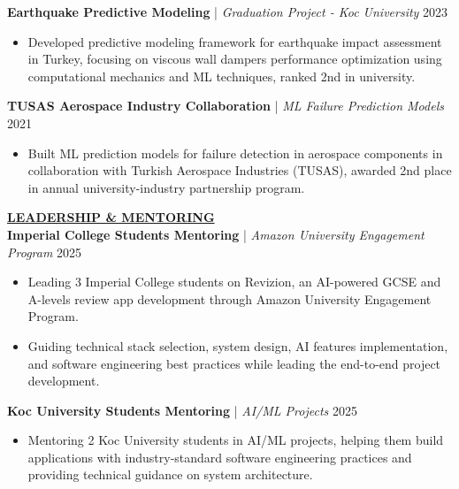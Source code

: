 \documentclass{article}
\newlength{\remaining}
\renewcommand{\section}[1]{
  \vspace{1.0em}\setlength{\remaining}{\textwidth-\widthof{\uppercase{#1}}}
    \noindent\underline{\fontsize{10}{15}\bfseries\uppercase{#1}\hspace*{\remaining}} \\
}
\renewcommand{\subsection}[3]{
    \noindent\textbf{#1} | \emph{#2} \hfill #3  
}
\begin{document}
    \subsection{Earthquake Predictive Modeling}{Graduation Project - Koc University}{2023}
    \begin{itemize}
        \item Developed predictive modeling framework for earthquake impact assessment in Turkey, focusing on viscous wall dampers performance optimization using computational mechanics and ML techniques, ranked 2nd in university.
    \end{itemize}

    \subsection{TUSAS Aerospace Industry Collaboration}{ML Failure Prediction Models}{2021}
    \begin{itemize}
        \item Built ML prediction models for failure detection in aerospace components in collaboration with Turkish Aerospace Industries (TUSAS), awarded 2nd place in annual university-industry partnership program.
    \end{itemize}


\section{Leadership \& Mentoring}
\subsection{Imperial College Students Mentoring}{Amazon University Engagement Program}{2025}
\begin{itemize}
    \item Leading 3 Imperial College students on Revizion, an AI-powered GCSE and A-levels review app development through Amazon University Engagement Program.
    \item Guiding technical stack selection, system design, AI features implementation, and software engineering best practices while leading the end-to-end project development.
\end{itemize}

\subsection{Koc University Students Mentoring}{AI/ML Projects}{2025}
\begin{itemize}
    \item Mentoring 2 Koc University students in AI/ML projects, helping them build applications with industry-standard software engineering practices and providing technical guidance on system architecture.
\end{itemize}
\end{document}
